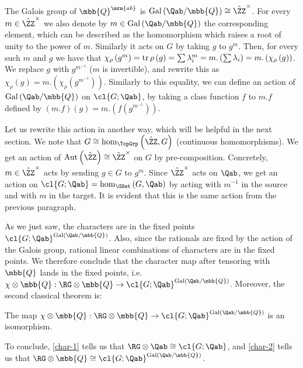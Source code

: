The Galois group of $\mbb{Q}^\mrm{ab}$ is $\Gal\left(\Qab / \mbb{Q}\right) \cong {\hat\ZZ}^\times$.
For every $m \in {\hat\ZZ}^\times$ we also denote by $m \in \Gal\left(\Qab / \mbb{Q}\right)$ the corresponding element, which can be described as the homomorphism which raises a root of unity to the power of $m$.
Similarly it acts on $G$ by taking $g$ to $g^m$.
Then, for every such $m$ and $g$ we have that
$
\chi_\rho\left(g^m\right)
= \operatorname{tr} \rho\left(g\right)
= \sum \lambda_i^m
= m. \left(\sum \lambda_i\right)
= m. \left(\chi_\rho\left(g\right)\right)
$.
We replace $g$ with $g^{m^{-1}}$ ($m$ is invertible), and rewrite this as $\chi_\rho\left(g\right) = m. \left(\chi_\rho\left(g^{m^{-1}}\right)\right)$.
Similarly to this equality, we can define an action of $\Gal\left(\Qab / \mbb{Q}\right)$ on $\cl{G; \Qab}$, by taking a class function $f$ to $m.f$ defined by $\left(m.f\right)\left(g\right) = m. \left(f\left(g^{m^{-1}}\right)\right)$.

Let us rewrite this action in another way, which will be helpful in the next section.
We note that $G \cong \hom_{\TopGrp}\left(\hat\ZZ, G\right)$ (continuous homomorphisms).
We get an action of $\aut\left(\hat\ZZ\right) \cong {\hat\ZZ}^\times$ on $G$ by pre-composition.
Concretely, $m \in {\hat\ZZ}^\times$ acts by sending $g \in G$ to $g^m$.
Since ${\hat\ZZ}^\times$ acts on $\Qab$, we get an action on $\cl{G; \Qab} = \hom_{\GSet}\left(G,  \Qab\right)$ by acting with $m^{-1}$ in the source and with $m$ in the target.
It is evident that this is the same action from the previous paragraph.

As we just saw, the characters are in the fixed points $\cl{G; \Qab}^{\Gal\left(\Qab / \mbb{Q}\right)}$.
Also, since the rationals are fixed by the action of the Galois group, rational linear combinations of characters are in the fixed points.
We therefore conclude that the character map after tensoring with $\mbb{Q}$ lands in the fixed points, i.e. $\chi \otimes \mbb{Q}: \RG \otimes \mbb{Q} \to \cl{G; \Qab}^{\Gal\left(\Qab / \mbb{Q}\right)}$.
Moreover, the second classical theorem is:

\begin{theorem}\label{char-2}
	The map $\chi \otimes \mbb{Q}: \RG \otimes \mbb{Q} \to \cl{G; \Qab}^{\Gal\left(\Qab / \mbb{Q}\right)}$ is an isomorphism.
\end{theorem}

To conclude, \ref{char-1} tells us that $\RG \otimes \Qab \cong \cl{G; \Qab}$, and \ref{char-2} tells us that $\RG \otimes \mbb{Q} \cong \cl{G; \Qab}^{\Gal\left(\Qab / \mbb{Q}\right)}$.
